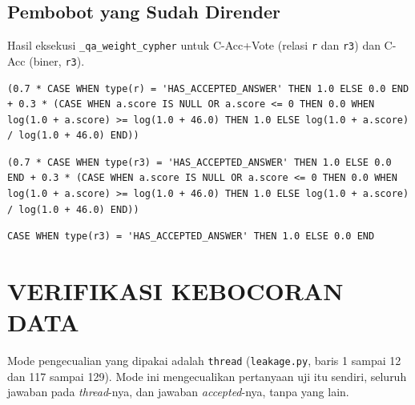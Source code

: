 \section{Pembobot yang Sudah Dirender}
\label{sec:lamp-d-render}

Hasil eksekusi \texttt{\_\allowbreak{}qa\_\allowbreak{}weight\_\allowbreak{}cypher} untuk C-Acc+Vote (relasi \texttt{r} dan \texttt{r3}) dan C-Acc (biner, \texttt{r3}).


\begin{lstlisting}[caption={Pembobot C-Acc+Vote untuk satu \emph{hop} (relasi \texttt{r}).}, label={lst:w-vote-1}, frame=single, captionpos=t, language={}, basicstyle=\ttfamily\scriptsize, breaklines=true, breakatwhitespace=false, columns=fullflexible, keepspaces=true]
(0.7 * CASE WHEN type(r) = 'HAS_ACCEPTED_ANSWER' THEN 1.0 ELSE 0.0 END + 0.3 * (CASE WHEN a.score IS NULL OR a.score <= 0 THEN 0.0 WHEN log(1.0 + a.score) >= log(1.0 + 46.0) THEN 1.0 ELSE log(1.0 + a.score) / log(1.0 + 46.0) END))
\end{lstlisting}

\begin{lstlisting}[caption={Pembobot C-Acc+Vote untuk dua \emph{hop} (relasi \texttt{r3}).}, label={lst:w-vote-2}, frame=single, captionpos=t, language={}, basicstyle=\ttfamily\scriptsize, breaklines=true, breakatwhitespace=false, columns=fullflexible, keepspaces=true]
(0.7 * CASE WHEN type(r3) = 'HAS_ACCEPTED_ANSWER' THEN 1.0 ELSE 0.0 END + 0.3 * (CASE WHEN a.score IS NULL OR a.score <= 0 THEN 0.0 WHEN log(1.0 + a.score) >= log(1.0 + 46.0) THEN 1.0 ELSE log(1.0 + a.score) / log(1.0 + 46.0) END))
\end{lstlisting}

\begin{lstlisting}[caption={Pembobot C-Acc (biner, relasi \texttt{r3}).}, label={lst:w-acc}, frame=single, captionpos=t, language={}, basicstyle=\ttfamily\scriptsize, breaklines=true, breakatwhitespace=false, columns=fullflexible, keepspaces=true]
CASE WHEN type(r3) = 'HAS_ACCEPTED_ANSWER' THEN 1.0 ELSE 0.0 END
\end{lstlisting}


\cleardoublepage
\chapter{VERIFIKASI KEBOCORAN DATA}
\label{lamp:kebocoran}

Mode pengecualian yang dipakai adalah \texttt{thread} (\texttt{leakage.py}, baris 1 sampai 12 dan 117 sampai 129). Mode ini mengecualikan pertanyaan uji itu sendiri, seluruh jawaban pada \emph{thread}-nya, dan jawaban \emph{accepted}-nya, tanpa yang lain.

